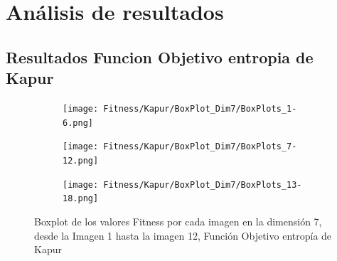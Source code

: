 \documentclass[conference]{IEEEtran}
\begin{document}


\section{Análisis de resultados} \label{sec:ce}
\subsection{Resultados Funcion Objetivo entropia de Kapur}
\begin{figure}
    \centering

    \begin{subfigure}{0.5\textwidth}
        \texttt{[image: Fitness/Kapur/BoxPlot\_Dim7/BoxPlots\_1-6.png]}
    \end{subfigure}
    
    \begin{subfigure}{0.5\textwidth}
        \texttt{[image: Fitness/Kapur/BoxPlot\_Dim7/BoxPlots\_7-12.png]}
    \end{subfigure}
         \begin{subfigure}{0.5\textwidth}
        \texttt{[image: Fitness/Kapur/BoxPlot\_Dim7/BoxPlots\_13-18.png]}
    \end{subfigure}
    \caption{Boxplot de los valores Fitness por cada imagen en la dimensión 7, desde la Imagen 1 hasta la imagen 12, Función Objetivo entropía de Kapur}
\label{fig:imagenes}    
\end{figure}
\end{document}
